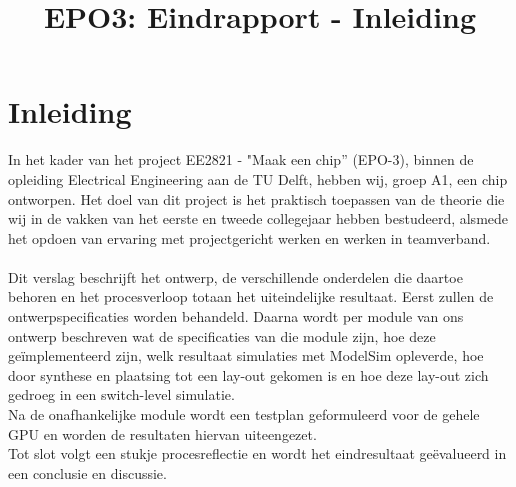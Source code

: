 \documentclass{scrartcl} %
\author{}
\title{EPO3: Eindrapport - Inleiding}
\begin{document}
\chapter{Inleiding}
\label{ch:inleiding}

In het kader van het project EE2821 - "Maak een chip'' (EPO-3), binnen de opleiding Electrical Engineering aan de TU Delft, hebben wij, groep A1, een chip ontworpen. Het doel van dit project is het praktisch toepassen van de theorie die wij in de vakken van het eerste en tweede collegejaar hebben bestudeerd, alsmede het opdoen van ervaring met projectgericht werken en werken in teamverband.
\\\\
Dit verslag beschrijft het ontwerp, de verschillende onderdelen die daartoe behoren en het procesverloop totaan het uiteindelijke resultaat. Eerst zullen de ontwerpspecificaties worden behandeld. Daarna wordt per module van ons ontwerp beschreven wat de specificaties van die module zijn, hoe deze geïmplementeerd zijn, welk resultaat simulaties met ModelSim opleverde, hoe door synthese en plaatsing tot een lay-out gekomen is en hoe deze lay-out zich gedroeg in een switch-level simulatie.
\\
Na de onafhankelijke module wordt een testplan geformuleerd voor de gehele GPU en worden de resultaten hiervan uiteengezet.
\\
Tot slot volgt een stukje procesreflectie en wordt het eindresultaat geëvalueerd in een conclusie en discussie.
\end{document}
